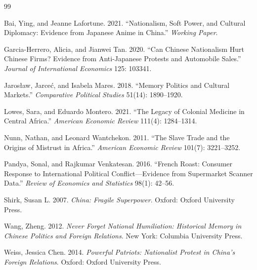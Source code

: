 \documentclass[12pt]{article}
\begin{document}
\newpage


\begin{thebibliography}{99}

Bai, Ying, and Jeanne Lafortune. 2021.
``Nationalism, Soft Power, and Cultural Diplomacy: Evidence from Japanese Anime in China.''
\textit{Working Paper}.

Garcia-Herrero, Alicia, and Jianwei Tan. 2020.
``Can Chinese Nationalism Hurt Chinese Firms? Evidence from Anti-Japanese Protests and Automobile Sales.''
\textit{Journal of International Economics} 125: 103341.

Jaros{\l}aw, Jarce{\'c}, and Isabela Mares. 2018.
``Memory Politics and Cultural Markets.''
\textit{Comparative Political Studies} 51(14): 1890--1920.

Lowes, Sara, and Eduardo Montero. 2021.
``The Legacy of Colonial Medicine in Central Africa.''
\textit{American Economic Review} 111(4): 1284--1314.

Nunn, Nathan, and Leonard Wantchekon. 2011.
``The Slave Trade and the Origins of Mistrust in Africa.''
\textit{American Economic Review} 101(7): 3221--3252.

Pandya, Sonal, and Rajkumar Venkatesan. 2016.
``French Roast: Consumer Response to International Political Conflict---Evidence from Supermarket Scanner Data.''
\textit{Review of Economics and Statistics} 98(1): 42--56.

Shirk, Susan L. 2007.
\textit{China: Fragile Superpower}. Oxford: Oxford University Press.

Wang, Zheng. 2012.
\textit{Never Forget National Humiliation: Historical Memory in Chinese Politics and Foreign Relations}. New York: Columbia University Press.

Weiss, Jessica Chen. 2014.
\textit{Powerful Patriots: Nationalist Protest in China's Foreign Relations}. Oxford: Oxford University Press.

\end{thebibliography}
\end{document}
